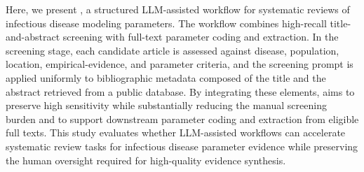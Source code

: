 Here, we present \metagent{}, a structured LLM-assisted workflow for systematic reviews of infectious disease modeling parameters. The workflow combines high-recall title-and-abstract screening with full-text parameter coding and extraction. In the screening stage, each candidate article is assessed against disease, population, location, empirical-evidence, and parameter criteria, and the screening prompt is applied uniformly to bibliographic metadata composed of the title and the abstract retrieved from a public database. By integrating these elements, \metagent{} aims to preserve high sensitivity while substantially reducing the manual screening burden and to support downstream parameter coding and extraction from eligible full texts. This study evaluates whether LLM-assisted workflows can accelerate systematic review tasks for infectious disease parameter evidence while preserving the human oversight required for high-quality evidence synthesis.

